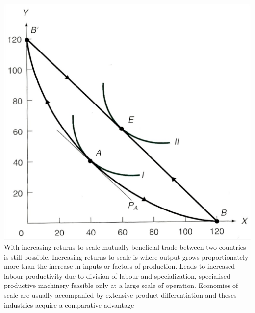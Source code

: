 \documentclass[12pt]{examnotes}
\begin{document}
\includegraphics[scale=0.2]{./imgs/61.jpg}
\ra With increasing returns to scale mutually beneficial trade between two countries is still possible. \ra Increasing returns to scale is where output grows proportionately more than the increase in inputs or factors of production. Leads to increased labour productivity due to division of labour and specialization, specialised productive machinery feasible only at a large scale of operation. 
\ra Economies of scale are usually accompanied by extensive product differentiation and theses industries acquire a comparative advantage
\end{document}
